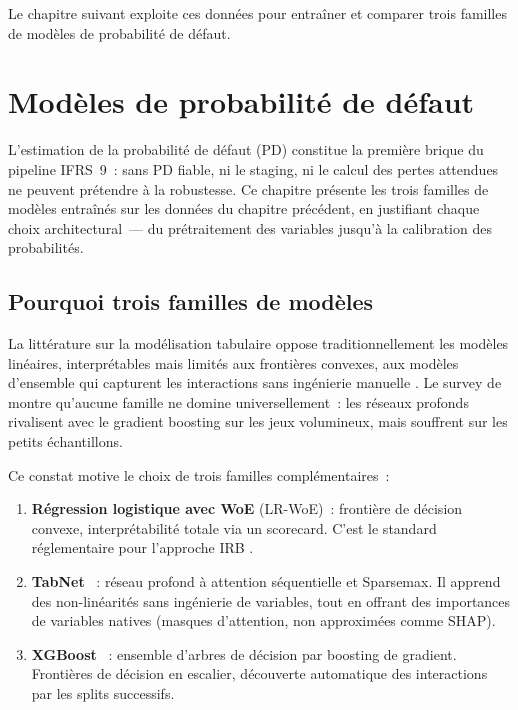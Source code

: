\documentclass[12pt, a4paper, twoside, openright]{report}
\theoremstyle{definition}
\begin{document}
Le chapitre suivant exploite ces données pour entraîner et comparer trois familles de modèles de probabilité de défaut.


\chapter{Modèles de probabilité de défaut}
\label{chap:modeles-pd}

L'estimation de la probabilité de défaut (PD) constitue la première brique du pipeline IFRS~9~: sans PD fiable, ni le staging, ni le calcul des pertes attendues ne peuvent prétendre à la robustesse. Ce chapitre présente les trois familles de modèles entraînés sur les données du chapitre précédent, en justifiant chaque choix architectural~--- du prétraitement des variables jusqu'à la calibration des probabilités.

\section{Pourquoi trois familles de modèles}
\label{sec:pd:trois-familles}

La littérature sur la modélisation tabulaire oppose traditionnellement les modèles linéaires, interprétables mais limités aux frontières convexes, aux modèles d'ensemble qui capturent les interactions sans ingénierie manuelle \citep{grinsztajn2022}. Le survey de \citet{borisov2022} montre qu'aucune famille ne domine universellement~: les réseaux profonds rivalisent avec le gradient boosting sur les jeux volumineux, mais souffrent sur les petits échantillons.

Ce constat motive le choix de trois familles complémentaires~:

\begin{enumerate}[nosep]
  \item \textbf{Régression logistique avec WoE} (LR-WoE)~: frontière de décision convexe, interprétabilité totale via un scorecard. C'est le standard réglementaire pour l'approche IRB \citep{anderson2007, siddiqi2006}.
  \item \textbf{TabNet} \citep{arik_pfister2021}~: réseau profond à attention séquentielle et Sparsemax. Il apprend des non-linéarités sans ingénierie de variables, tout en offrant des importances de variables natives (masques d'attention, non approximées comme SHAP).
  \item \textbf{XGBoost} \citep{chen_guestrin2016}~: ensemble d'arbres de décision par boosting de gradient. Frontières de décision en escalier, découverte automatique des interactions par les splits successifs.
\end{enumerate}
\end{document}
